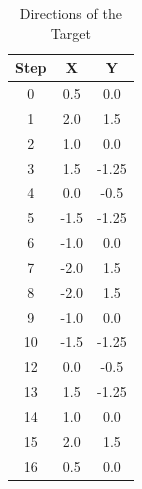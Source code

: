 \begin{table}[htpb]
    \caption[Ball Directions]{Directions of the Target} \label{tab:ballMove}
    \centering
    \begin{tabular}{|c| c |c|}
        \toprule
        Step & X & Y  \\
        \midrule
          0 &  0.5 & 0.0 \\
          1 &  2.0 & 1.5 \\
          2 &  1.0 & 0.0 \\
          3 &  1.5 & -1.25 \\
          4 &  0.0 & -0.5 \\
          5 &  -1.5 & -1.25 \\
          6 &  -1.0 & 0.0 \\
          7 &  -2.0 & 1.5 \\
          8 &  -2.0 & 1.5 \\
          9 &  -1.0 & 0.0 \\
          10 &  -1.5 & -1.25 \\
          12 &  0.0 & -0.5 \\
          13 &  1.5 & -1.25 \\
          14 &  1.0 & 0.0 \\
          15 &  2.0 & 1.5 \\
          16 &  0.5 & 0.0 \\ 
        \bottomrule
    \end{tabular}
  \end{table}
  